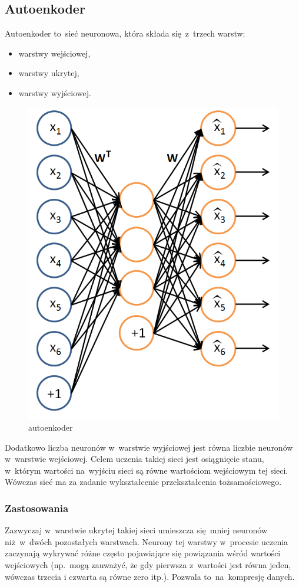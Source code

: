\subsection{Autoenkoder}
Autoenkoder \cite{Autoencoder} to~sieć neuronowa, która składa się~z~trzech warstw:
\begin{itemize}
	\item warstwy wejściowej,
	\item warstwy ukrytej,
	\item warstwy wyjściowej.
\end{itemize}

\begin{figure}[H]
	\centering
	\includegraphics[width=0.5\linewidth]{img/autoencoder.png}
	\caption{autoenkoder}
\end{figure}

Dodatkowo liczba neuronów w~warstwie wyjściowej jest równa liczbie neuronów w~warstwie wejściowej.
Celem uczenia takiej sieci jest osiągnięcie stanu, w~którym wartości na~wyjściu sieci są równe
wartościom wejściowym tej sieci. Wówczas sieć ma za zadanie wykształcenie przekształcenia tożsamościowego.

\subsubsection{Zastosowania}
Zazwyczaj w~warstwie ukrytej takiej sieci umieszcza się~mniej neuronów niż~w~dwóch pozostałych warstwach.
Neurony tej warstwy w~procesie uczenia zaczynają wykrywać różne często pojawiające się powiązania
wśród wartości wejściowych (np.~mogą zauważyć, że gdy pierwsza z~wartości jest równa jeden,
wówczas trzecia i czwarta są równe zero itp.).
Pozwala to~na~kompresję danych.

